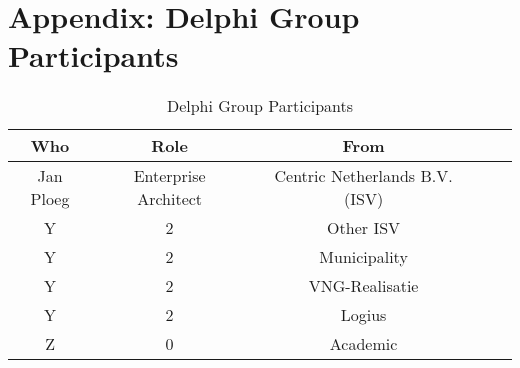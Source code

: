 \chapter{Appendix: Delphi Group Participants}
\label{app:delphigroupparticipants}

\begin{table}[!h]
	\begin{center}
		\begin{tabular}{@{}ccccc@{}}
			\toprule
			Who & Role & From \\ \midrule
			Jan Ploeg & Enterprise Architect & Centric Netherlands B.V. (ISV) \\
			Y    & 2    & Other ISV \\
			Y    & 2    & Municipality \\
			Y    & 2    & VNG-Realisatie \\
			Y    & 2    & Logius \\
			Z    & 0    & Academic \\ \bottomrule
		\end{tabular}
		\caption{Delphi Group Participants}
		\label{tab:delphigroupparticipants}
	\end{center}
\end{table}